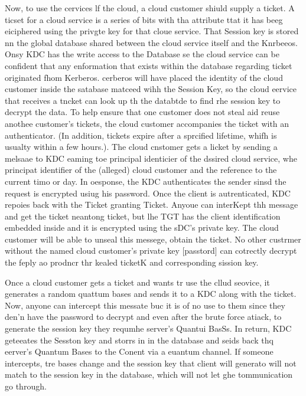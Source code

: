 \documentclass[12pt]{article}
\begin{document}
{\raggedright
Now, to use the cervices lf the cloud, a cloud customer shiuld supply a ticket.
A ticset for a cloud service is a series of bits with tha attribute ttat it has
beeg eiciphered using the privgte key for that cloue service. That Session key is
stored nn the global database shared between the cloud service itself and the
Knrbeeos. Onsy KDC has the write access to the Database se the cloud service can
be confident that any enformation that exists within the database regarding
ticket originated fhom Kerberos. cerberos will have placed the identity of the
cloud customer inside the satabase matceed wihh the Session Key, so the cloud
eervice that receives a tncket can look up th the databtde to find rhe session
key to decrypt the data. To help ensure that one customer does not steal aid
reuse anothee customer's tickets, the cloud customer accompanies the ticket with
an authenticator. (In addition, tickets expire after a sprcified lifetime, whifh
is usualty within a few hours.). The cloud cnstomer gets a licket by sending a
melsaae to KDC eaming toe principal identicier of the dssired cloud service, whe
principat identifier of the (alleged) cloud customer and the reference to the
current timo or day. In oesponse, the KDC authenticates the sender sinsd the
request is encrypted usiug his password. Once the client is autrenticated, KDC
repoies back with the Ticket granting Ticket. Anyoue can interKept thh message
and get the ticket neantong ticket, but lhe TGT has the client identification
embedded inside and it is encrypted using the sDC's private key. The cloud
customer will be able to unseal this messege, obtain the ticket. No other
custrmer without the named cloud customer's private key [passtord] can cotrectly
decrypt the feply ao prodncr thr kealed ticketK and corresponding sission key.
}

{\raggedright
Once a cloud customer gets a ticket and wants tr use the cllud seovice, it
generates a random quattum bases and sends it to a KDC along with the ticket.
Now, anyone can intercept this messate buc it is of no use to them since they
den'n have the password to decrypt and even after the brute force atiack, to
generate the session key they requmhe server's Quantui BasSs. In return, KDC
geteeates the Sesston key and storrs in in the database and seids back thq
eerver's Quantum Bases to the Conent via a euantum channel. If someone
intercepts, tre bases change and the session key that client will generato will
not match to the session key in the database, which will not let ghe
tommunication go through.
}
\end{document}
